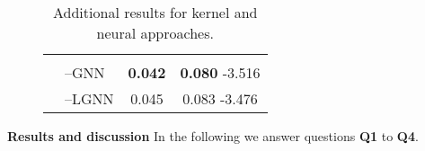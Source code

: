 \documentclass{article}
\newcommand{\xhdr}[1]{{\noindent\bfseries #1}}
\theoremstyle{definition}
\begin{document}
\begin{table}
\begin{center}
\begin{subfigure}[c,top]{0.48\textwidth}
{\begin{tabular}{@{}c <{\enspace}@{}lcc@{}}
{						\scriptsize }                                                                                                                                \\
					&  --\textsf{GNN}      &\textbf{0.042} {\scriptsize }   & \textbf{0.080}                                                                           {\scriptsize } -3.516 {\scriptsize } \\			
					\cmidrule{2-4}	
					\multirow{2}{*}{\rotatebox{90}{}}   & --\textsf{LGNN} &  0.045  \scriptsize  & 0.083 {\scriptsize } -3.476  {\scriptsize } \\
					\bottomrule
			\end{tabular}}\vspace{14pt}
		\end{subfigure}
	\end{center}
		\caption{Additional results for kernel and neural approaches.}\label{add_tt}
\end{table}

\xhdr{Results and discussion} In the following we answer questions \textbf {Q1} to \textbf{Q4}.
\end{document}
